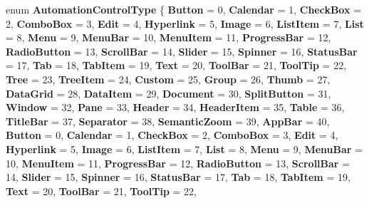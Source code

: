 \begin{DoxyCompactItemize}
enum {\bfseries Automation\+Control\+Type} \{ \newline
{\bfseries Button} = 0, 
{\bfseries Calendar} = 1, 
{\bfseries Check\+Box} = 2, 
{\bfseries Combo\+Box} = 3, 
\newline
{\bfseries Edit} = 4, 
{\bfseries Hyperlink} = 5, 
{\bfseries Image} = 6, 
{\bfseries List\+Item} = 7, 
\newline
{\bfseries List} = 8, 
{\bfseries Menu} = 9, 
{\bfseries Menu\+Bar} = 10, 
{\bfseries Menu\+Item} = 11, 
\newline
{\bfseries Progress\+Bar} = 12, 
{\bfseries Radio\+Button} = 13, 
{\bfseries Scroll\+Bar} = 14, 
{\bfseries Slider} = 15, 
\newline
{\bfseries Spinner} = 16, 
{\bfseries Status\+Bar} = 17, 
{\bfseries Tab} = 18, 
{\bfseries Tab\+Item} = 19, 
\newline
{\bfseries Text} = 20, 
{\bfseries Tool\+Bar} = 21, 
{\bfseries Tool\+Tip} = 22, 
{\bfseries Tree} = 23, 
\newline
{\bfseries Tree\+Item} = 24, 
{\bfseries Custom} = 25, 
{\bfseries Group} = 26, 
{\bfseries Thumb} = 27, 
\newline
{\bfseries Data\+Grid} = 28, 
{\bfseries Data\+Item} = 29, 
{\bfseries Document} = 30, 
{\bfseries Split\+Button} = 31, 
\newline
{\bfseries Window} = 32, 
{\bfseries Pane} = 33, 
{\bfseries Header} = 34, 
{\bfseries Header\+Item} = 35, 
\newline
{\bfseries Table} = 36, 
{\bfseries Title\+Bar} = 37, 
{\bfseries Separator} = 38, 
{\bfseries Semantic\+Zoom} = 39, 
\newline
{\bfseries App\+Bar} = 40, 
{\bfseries Button} = 0, 
{\bfseries Calendar} = 1, 
{\bfseries Check\+Box} = 2, 
\newline
{\bfseries Combo\+Box} = 3, 
{\bfseries Edit} = 4, 
{\bfseries Hyperlink} = 5, 
{\bfseries Image} = 6, 
\newline
{\bfseries List\+Item} = 7, 
{\bfseries List} = 8, 
{\bfseries Menu} = 9, 
{\bfseries Menu\+Bar} = 10, 
\newline
{\bfseries Menu\+Item} = 11, 
{\bfseries Progress\+Bar} = 12, 
{\bfseries Radio\+Button} = 13, 
{\bfseries Scroll\+Bar} = 14, 
\newline
{\bfseries Slider} = 15, 
{\bfseries Spinner} = 16, 
{\bfseries Status\+Bar} = 17, 
{\bfseries Tab} = 18, 
\newline
{\bfseries Tab\+Item} = 19, 
{\bfseries Text} = 20, 
{\bfseries Tool\+Bar} = 21, 
{\bfseries Tool\+Tip} = 22, 

\end{DoxyCompactItemize}
